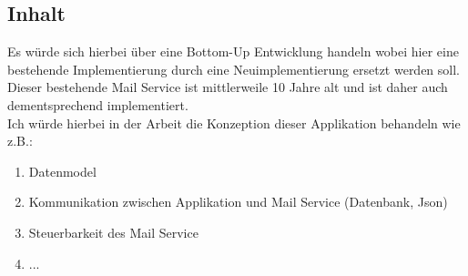 \documentclass[11pt, a4paper, twoside]{article}   	%
\begin{document}
\subsection{Inhalt}
Es würde sich hierbei über eine Bottom-Up Entwicklung handeln wobei hier eine bestehende Implementierung durch eine Neuimplementierung ersetzt werden soll.\\
Dieser bestehende Mail Service ist mittlerweile 10 Jahre alt und ist daher auch dementsprechend implementiert.\\
Ich würde hierbei in der Arbeit die Konzeption dieser Applikation behandeln wie z.B.:\\
\begin{enumerate}
	\item Datenmodel
	\item Kommunikation zwischen Applikation und Mail Service (Datenbank, Json)
	\item Steuerbarkeit des Mail Service
	\item ...
\end{enumerate}
\newpage
\end{document}
